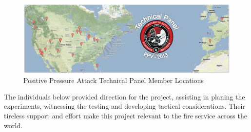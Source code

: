 \documentclass{article}
\begin{document}
\begin{figure}[H]
	\centering
	\includegraphics[width = 5in]{0_Images/Technical_Panel/TechnicalPanelLocations.png} 
	\caption{Positive Pressure Attack Technical Panel Member Locations}
	\label{fig:PanelLocatoins}
\end{figure} 

The individuals below provided direction for the project, assisting in planing the experiments, witnessing the testing and developing tactical considerations. Their tireless support and effort make this project relevant to the fire service across the world. 

\renewcommand{\arraystretch}{1.5}
\end{document}
